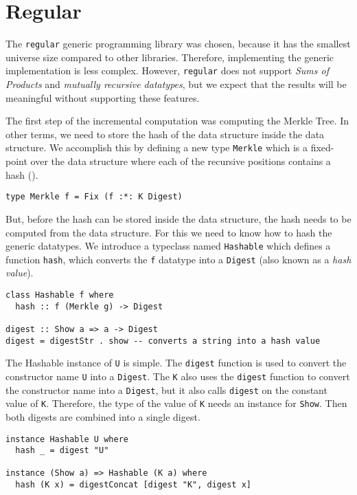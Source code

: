 \section{Regular}

The \texttt{regular} generic programming library was chosen, because it has the smallest universe size compared to other libraries. Therefore, implementing the generic implementation is less complex. However, \texttt{regular} does not support \textit{Sums of Products} and \textit{mutually recursive datatypes}, but we expect that the results will be meaningful without supporting these features.


The first step of the incremental computation was computing the Merkle Tree. In other terms, we need to store the hash of the data structure inside the data structure. We accomplish this by defining a new type \texttt{Merkle} which is a fixed-point over the data structure where each of the recursive positions contains a hash ().

\begin{verbatim}
type Merkle f = Fix (f :*: K Digest)
\end{verbatim}

But, before the hash can be stored inside the data structure, the hash needs to be computed from the data structure. For this we need to know how to hash the generic datatypes. We introduce a typeclass named \texttt{Hashable} which defines a function \texttt{hash}, which converts the \texttt{f} datatype into a \texttt{Digest} (also known as a \textit{hash value}).

\begin{verbatim}
class Hashable f where
  hash :: f (Merkle g) -> Digest

digest :: Show a => a -> Digest
digest = digestStr . show -- converts a string into a hash value
\end{verbatim}

The Hashable instance of \texttt{U} is simple. The \texttt{digest} function is used to convert the constructor name \texttt{U} into a \texttt{Digest}. The \texttt{K} also uses the \texttt{digest} function to convert the constructor name into a \texttt{Digest}, but it also calls \texttt{digest} on the constant value of \texttt{K}. Therefore, the type of the value of \texttt{K} needs an instance for \texttt{Show}. Then both digests are combined into a single digest. 

\begin{verbatim}
instance Hashable U where
  hash _ = digest "U"

instance (Show a) => Hashable (K a) where
  hash (K x) = digestConcat [digest "K", digest x]
\end{verbatim}

